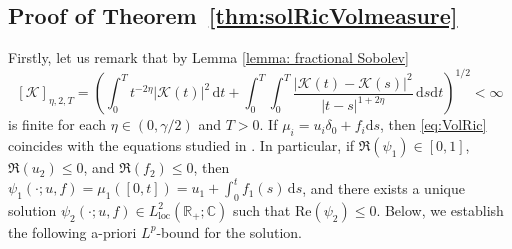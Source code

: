 \documentclass[10pt,a4paper,reqno]{amsart}
\newcommand{\R}{\mathbb{R}}
\newcommand{\C}{\mathbb{C}}
\theoremstyle{plain}
\theoremstyle{definition}
\theoremstyle{remark}
\theoremstyle{example}
\begin{document}
\subsection{Proof of Theorem~\ref{thm:solRicVolmeasure}}\label{sec:proof-Theorem2.3}

Firstly, let us remark that by Lemma \ref{lemma: fractional Sobolev} 
$$
    [\mathcal{K}]_{\eta, 2, T} = \left( \int_0^T t^{-2\eta}|\mathcal{K}(t)|^2\, \mathrm{d}t + \int_0^T \int_0^T \frac{|\mathcal{K}(t) - \mathcal{K}(s)|^2}{|t-s|^{1+2\eta}}\, \mathrm{d}s\mathrm{d}t \right)^{1/2} < \infty
$$
is finite for each $\eta \in (0,\gamma/2)$ and $T > 0$. If $\mu_i = u_i \delta_0 + f_i \mathrm{d}s$, then \eqref{eq:VolRic} coincides with the equations studied in \cite[Thm. 7.1(ii)]{abi2019affine}. In particular, if $\Re(\psi_1) \in [0,1]$, $\Re(u_2) \leq 0$, and $\Re(f_2) \leq 0$, then $\psi_1(\cdot;u,f) = \mu_1([0,t]) = u_1 + \int_0^t f_1(s)\, \mathrm{d}s$, and there exists a unique solution $\psi_2(\cdot; u,f) \in L_{\mathrm{loc}}^2(\R_+; \C)$ such that $\mathrm{Re}(\psi_2) \leq 0$. Below, we establish the following a-priori $L^p$-bound for the solution.
\end{document}
